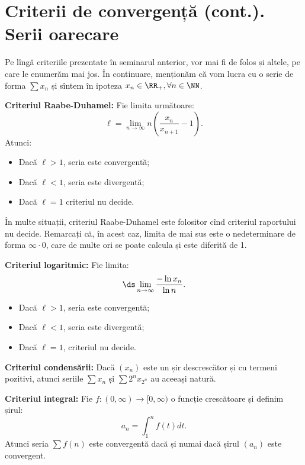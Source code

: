 
\chapter{Criterii de convergență (cont.). Serii oarecare}

Pe lîngă criteriile prezentate în seminarul anterior, vor mai fi de folos
și altele, pe care le enumerăm mai jos. În continuare, menționăm că
vom lucra cu o serie de forma $ \sum x_n $ și sîntem în ipoteza
$ x_n \in \RR_+, \forall n \in \NN $.

\textbf{Criteriul Raabe-Duhamel:} Fie limita următoare:
\[
    \ell = \lim_{n \to \infty} n \left( \dfrac{x_n}{x_{n+1}} - 1 \right).
\]
Atunci:
\begin{itemize}
    \item Dacă $ \ell > 1 $, seria este convergentă;
    \item Dacă $ \ell < 1 $, seria este divergentă;
    \item Dacă $ \ell = 1 $ criteriul nu decide.
\end{itemize}

În multe situații, criteriul Raabe-Duhamel este folositor cînd criteriul
raportului nu decide. Remarcați că, în acest caz, limita de mai sus
este o nedeterminare de forma $ \infty \cdot 0 $, care de multe ori
se poate calcula și este diferită de 1.

\vspace{1cm}

\textbf{Criteriul logaritmic:} Fie limita:
\[
    \ds\lim_{n \to \infty} \dfrac{- \ln x_n}{\ln n}.
\]
\begin{itemize}
    \item Dacă $ \ell > 1 $, seria este convergentă;
    \item Dacă $ \ell < 1 $, seria este divergentă;
    \item Dacă $ \ell = 1 $, criteriul nu decide.
\end{itemize}

\vspace{1cm}

\textbf{Criteriul condensării:} Dacă $ (x_n) $ este un șir
descrescător și cu termeni pozitivi, atunci seriile $ \sum x_n $ și
$ \sum 2^n x_{2^n} $ au aceeași natură.

\vspace{1cm}

\textbf{Criteriul integral:} Fie $ f : (0, \infty) \to [0, \infty) $ o funcție
crescătoare și definim șirul:
\[
    a_n = \int_1^n f(t) dt.
\]
Atunci seria $ \sum f(n) $ este convergentă dacă și numai dacă șirul $ (a_n) $ este
convergent.

